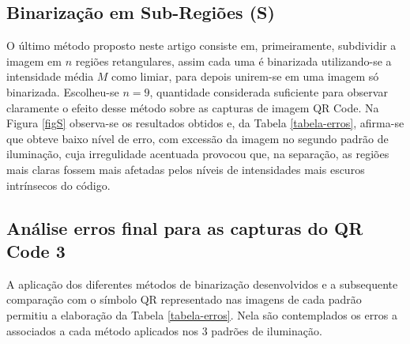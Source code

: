 \documentclass{ceel}
\begin{document}
\begin{multicols}{2}
\begin{minipage}[h]{\columnwidth}
\vspace{-0.1cm}
\caption{Imagens resultantes da Binarização Pós Equalização por Histograma para o QR Code 3 nos padrões de (a) Iluminação 1, (c) Iluminação 2 e (e) Iluminação 3, com suas respectivas imagens diferença em (b), (d) e (f).} \label{figEH}
\end{minipage}


\subsection{Binarização em Sub-Regiões (S)} \label{Cdiv} 
O último método proposto neste artigo consiste em, primeiramente, subdividir a imagem em $n$ regiões retangulares, assim cada uma é binarizada utilizando-se a intensidade média $M$ como limiar, para depois unirem-se em uma imagem só binarizada. Escolheu-se $n=9$, quantidade considerada suficiente para observar claramente o efeito desse método sobre as capturas de imagem QR Code. Na Figura \ref{figS} observa-se os resultados obtidos e, da Tabela \ref{tabela-erros}, afirma-se que obteve baixo nível de erro, com excessão da imagem no segundo padrão de iluminação, cuja irregulidade acentuada provocou que, na separação, as regiões mais claras fossem mais afetadas pelos níveis de intensidades mais escuros intrínsecos do código.


\subsection{Análise erros final para as capturas do QR Code 3}
A aplicação dos diferentes métodos de binarização desenvolvidos e a subsequente comparação com o símbolo QR representado nas imagens de cada padrão permitiu a elaboração da Tabela \ref{tabela-erros}. Nela são contemplados os erros a associados a cada método aplicados nos 3 padrões de iluminação. 



\end{multicols}
\end{document}
